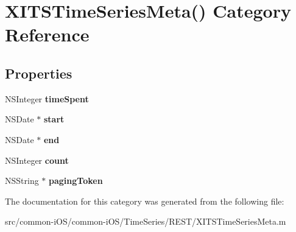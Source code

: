 \hypertarget{category_x_i_t_s_time_series_meta_07_08}{}\section{X\+I\+T\+S\+Time\+Series\+Meta() Category Reference}
\label{category_x_i_t_s_time_series_meta_07_08}
\subsection*{Properties}
\begin{DoxyCompactItemize}
\item 
\hypertarget{category_x_i_t_s_time_series_meta_07_08_a3d36131da521f6bc479292a5b39358f7}{}\label{category_x_i_t_s_time_series_meta_07_08_a3d36131da521f6bc479292a5b39358f7} 
N\+S\+Integer {\bfseries time\+Spent}
\item 
\hypertarget{category_x_i_t_s_time_series_meta_07_08_abf031643009529fd7f92a892de39f9b1}{}\label{category_x_i_t_s_time_series_meta_07_08_abf031643009529fd7f92a892de39f9b1} 
N\+S\+Date $\ast$ {\bfseries start}
\item 
\hypertarget{category_x_i_t_s_time_series_meta_07_08_a6c9c334c4c18a248649f1cc793c17fbb}{}\label{category_x_i_t_s_time_series_meta_07_08_a6c9c334c4c18a248649f1cc793c17fbb} 
N\+S\+Date $\ast$ {\bfseries end}
\item 
\hypertarget{category_x_i_t_s_time_series_meta_07_08_a8adfd24f26cd911659bc6fd7d64af2a8}{}\label{category_x_i_t_s_time_series_meta_07_08_a8adfd24f26cd911659bc6fd7d64af2a8} 
N\+S\+Integer {\bfseries count}
\item 
\hypertarget{category_x_i_t_s_time_series_meta_07_08_a2f3966643e106e9b45f1c6582edf178f}{}\label{category_x_i_t_s_time_series_meta_07_08_a2f3966643e106e9b45f1c6582edf178f} 
N\+S\+String $\ast$ {\bfseries paging\+Token}
\end{DoxyCompactItemize}


The documentation for this category was generated from the following file\+:\begin{DoxyCompactItemize}
\item 
src/common-\/i\+O\+S/common-\/i\+O\+S/\+Time\+Series/\+R\+E\+S\+T/X\+I\+T\+S\+Time\+Series\+Meta.\+m\end{DoxyCompactItemize}
